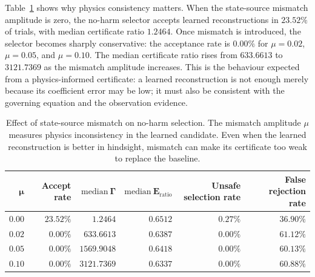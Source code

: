 \documentclass{article}
\numberwithin{equation}{section}
\theoremstyle{definition}
\begin{document}
\begin{table}[!ht]
\centering
\caption{Regime-level summary of the sufficiency sweep. Certificate-sufficient regimes satisfy median \(R_{\mathrm{learn}}/R_{\mathrm{base}}\le1\). Fallback-required regimes have median \(R_{\mathrm{learn}}/R_{\mathrm{base}}>1\).}
\label{tab:sufficiency-regime-summary}
\end{table}

Table~\ref{tab:mismatch-regime-summary} shows why physics consistency matters. When the state-source mismatch amplitude is zero, the no-harm selector accepts learned reconstructions in \(23.52\%\) of trials, with median certificate ratio \(1.2464\). Once mismatch is introduced, the selector becomes sharply conservative: the acceptance rate is \(0.00\%\) for \(\mu=0.02\), \(\mu=0.05\), and \(\mu=0.10\). The median certificate ratio rises from \(633.6613\) to \(3121.7369\) as the mismatch amplitude increases. This is the behaviour expected from a physics-informed certificate: a learned reconstruction is not enough merely because its coefficient error may be low; it must also be consistent with the governing equation and the observation evidence.

\begin{table}[!ht]
\centering
\caption{Effect of state-source mismatch on no-harm selection. The mismatch amplitude \(\mu\) measures physics inconsistency in the learned candidate. Even when the learned reconstruction is better in hindsight, mismatch can make its certificate too weak to replace the baseline.}
\label{tab:mismatch-regime-summary}
\begin{tabular}{rrrrrr}
	\toprule
	\(\boldsymbol{\mu}\) & \textbf{Accept rate} & \(\boldsymbol{\mathrm{median}\ \Gamma}\) & \(\boldsymbol{\mathrm{median}\ E_{\mathrm{ratio}}}\) & \textbf{Unsafe selection rate} & \textbf{False rejection rate} \\
	\midrule
	\(0.00\) & \(23.52\%\) & \(1.2464\) & \(0.6512\) & \(0.27\%\) & \(36.90\%\) \\
	\(0.02\) & \(0.00\%\) & \(633.6613\) & \(0.6387\) & \(0.00\%\) & \(61.12\%\) \\
	\(0.05\) & \(0.00\%\) & \(1569.9048\) & \(0.6418\) & \(0.00\%\) & \(60.13\%\) \\
	\(0.10\) & \(0.00\%\) & \(3121.7369\) & \(0.6337\) & \(0.00\%\) & \(60.88\%\) \\
	\bottomrule
\end{tabular}
\end{table}
\end{document}
